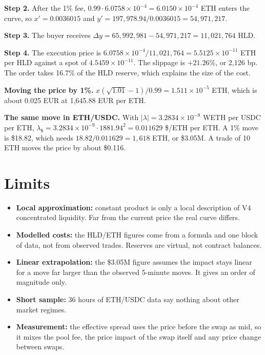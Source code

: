 \documentclass[11pt,a4paper]{article}
\begin{document}
\textbf{Step 2.} After the 1\% fee, $0.99\cdot6.0758\times10^{-4}=6.0150\times10^{-4}$ ETH enters the curve, so $x'=0.0036015$ and $y'=197{,}978.94/0.0036015=54{,}971{,}217$.

\textbf{Step 3.} The buyer receives $\Delta y=65{,}992{,}981-54{,}971{,}217=11{,}021{,}764$ HLD.

\textbf{Step 4.} The execution price is $6.0758\times10^{-4}/11{,}021{,}764=5.5125\times10^{-11}$ ETH per HLD against a spot of $4.5459\times10^{-11}$. The slippage is $+21.26\%$, or 2,126 bp. The order takes 16.7\% of the HLD reserve, which explains the size of the cost.

\textbf{Moving the price by 1\%.} $x(\sqrt{1.01}-1)/0.99=1.511\times10^{-5}$ ETH, which is about 0.025 EUR at 1,645.88 EUR per ETH.

\textbf{The same move in ETH/USDC.} With $|\lambda|=3.2834\times10^{-9}$ WETH per USDC per ETH, $\lambda_{\$}=3.2834\times10^{-9}\cdot1881.94^2=0.011629$ \$/ETH per ETH. A 1\% move is \$18.82, which needs $18.82/0.011629=1{,}618$ ETH, or \$3.05M. A trade of 10 ETH moves the price by about \$0.116.

\section{Limits}

\begin{itemize}
\item \textbf{Local approximation:} constant product is only a local description of V4 concentrated liquidity. Far from the current price the real curve differs.
\item \textbf{Modelled costs:} the HLD/ETH figures come from a formula and one block of data, not from observed trades. Reserves are virtual, not contract balances.
\item \textbf{Linear extrapolation:} the \$3.05M figure assumes the impact stays linear for a move far larger than the observed 5-minute moves. It gives an order of magnitude only.
\item \textbf{Short sample:} 36 hours of ETH/USDC data say nothing about other market regimes.
\item \textbf{Measurement:} the effective spread uses the price before the swap as mid, so it mixes the pool fee, the price impact of the swap itself and any price change between swaps.
\end{itemize}
\end{document}
